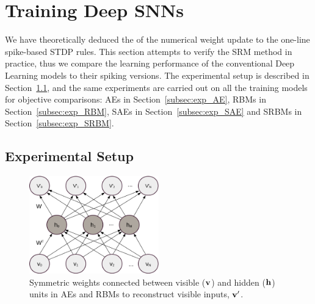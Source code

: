 \section{Training Deep SNNs}
\label{sec:dSNN}
We have theoretically deduced the \DIFdelbegin {}\DIFdelend \DIFaddbegin {}\DIFaddend of the numerical weight update to the one-line spike-based STDP rules.
This section attempts to verify the SRM method in practice, thus we compare the learning performance of the conventional Deep Learning models to their spiking versions.
\DIFaddbegin {}\DIFaddend The experimental setup is described in Section~\ref{subsec:SNN_setup}, and the same experiments are carried out on all the training models for objective comparisons: AEs in Section~\ref{subsec:exp_AE}, RBMs in Section~\ref{subsec:exp_RBM}, SAEs in Section~\ref{subsec:exp_SAE} and SRBMs in Section~\ref{subsec:exp_SRBM}.

\subsection{Experimental Setup}
\label{subsec:SNN_setup}
\begin{figure}
	\centering
	\includegraphics[width=0.5\textwidth]{pics_sdlm/AE.png}
	\caption[Reconstruction using AEs and RBMs.]{Symmetric weights connected between visible ($\bf{v}$) and hidden ($\bf{h}$) units in AEs and RBMs to reconstruct visible inputs, $\bf{v'}$.}
	\label{fig:sym_conn}
\end{figure}

